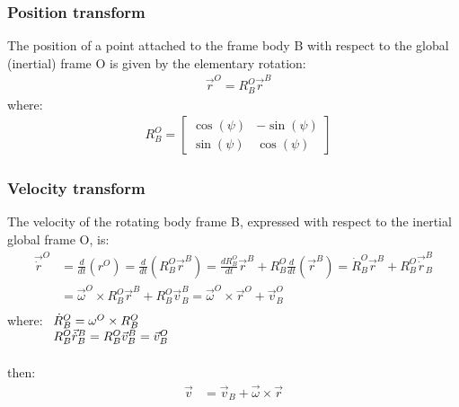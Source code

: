 \documentclass[12pt]{article}
\begin{document}
        \subsubsection{Position transform}
            The position of a point attached to the frame body B with respect to the 
            global (inertial) frame O is given by the elementary rotation:
            \begin{equation}
                \begin{aligned}
                    & \vec{r}^O = R^O_B \vec{r}^B
                \end{aligned}
            \end{equation}
            where:
            \begin{equation}
                \begin{aligned}
                    & R^O_B = \begin{bmatrix} \cos(\psi) & -\sin(\psi)\\ \sin(\psi) & \cos(\psi) \end{bmatrix}
                \end{aligned}
            \end{equation}

        \subsubsection{Velocity transform}
            The velocity of the rotating body frame B, expressed with respect to the inertial global frame O, is:
            \begin{equation}
                \begin{aligned}
                    \vec{\dot{r}}^O & = \frac{d}{dt} (r^O) = \frac{d}{dt} \left(R^O_B \vec{r}^B\right)
                    = \frac{dR^O_B}{dt} \vec{r}^B + R^O_B \frac{d}{dt} (\vec{r}^B) = \dot{R}^O_B \vec{r}^B + R^O_B \vec{\dot{r}}^B_B \\
                    & = \vec{\omega}^O \times R^O_B \vec{r}^B + R^O_B \vec{v}^B_B = \vec{\omega}^O \times \vec{r}^O + \vec{v}^O_B \\
                \end{aligned}
            \end{equation}
            where:  $ \begin{array}[t]{l}
                        \dot{R}^O_B = \omega^O \times R^O_B \\
                        R^O_B \vec{\dot{r}}^B_B = R^O_B \vec{v}^B_B = \vec{v}^O_B \\
                    \end{array} $ \\
                \\
            then:
            \begin{equation}
                \begin{aligned}
                    \vec{v} & = \vec{v}_B + \vec{\omega} \times \vec{r} \\
                \end{aligned}
            \end{equation}
\end{document}
